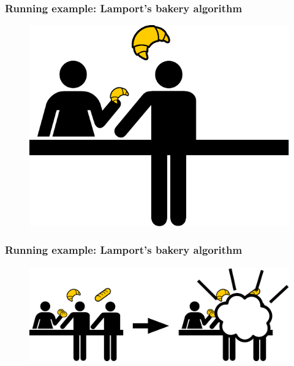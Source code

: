 \documentclass{beamer}
\begin{document}
\begin{frame}
  \frametitle{Running example: Lamport's bakery algorithm}
  \vfill
  
  \begin{figure}[!h]
  \includegraphics[scale=0.4]{order}
  \end{figure}
  
  \vspace{1cm}
\end{frame}

\begin{frame}
  \frametitle{Running example: Lamport's bakery algorithm}
  \vfill
  
  \begin{figure}[!h]
  \includegraphics[scale=0.4]{fight}
  \end{figure}
  
  \vspace{1cm}
\end{frame}
\end{document}
